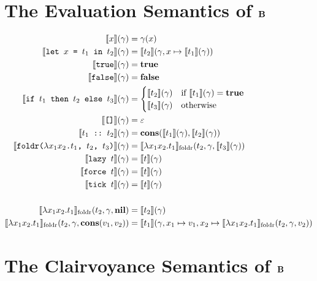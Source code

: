 \appendix
{}

\section{The Evaluation Semantics of \(\LB\)}\label{apx:eval-semantics}

\begin{align*}
  \EE{x}{\gamma} &= \gamma(x) \\
  \EE{\tlet{x}{t_1}{t_2}}{\gamma} &= \EE{t_2}{\gamma, x \mapsto \EE{t_1}{\gamma}} \\
  \EE{\ttrue}{\gamma} &= \strue \\
  \EE{\tfalse}{\gamma} &= \sfalse \\
  \EE{\tif{t_1}{t_2}{t_3}}{\gamma} &=
    \begin{cases}
      \EE{t_2}{\gamma} & \text{if \( \EE{t_{1}}{\gamma} = \strue \)} \\
      \EE{t_3}{\gamma} & \text{otherwise}
    \end{cases} \\
  \EE{\tnil}{\gamma} &= \varepsilon \\
  \EE{\tcons{t_1}{t_2}}{\gamma} &= \scons{\EE{t_1}{\gamma}}{\EE{t_2}{\gamma}} \\
  \EE{\tfoldr{x_1}{x_2}{t_1}{t_2}{t_3}}{\gamma} &= \EEF{x_1}{x_2}{t_1}{t_2}{\gamma}{\EE{t_3}{\gamma}} \\
  \EE{\tlazy{t}}{\gamma} &= \EE{t}{\gamma} \\
  \EE{\tforce{t}}{\gamma} &= \EE{t}{\gamma} \\
  \EE{\ttick{t}}{\gamma} &= \EE{t}{\gamma} \\ \\
  \EEF{x_1}{x_2}{t_1}{t_2}{\gamma}{\snil} &= \EE{t_2}{\gamma} \\
  \EEF{x_1}{x_2}{t_1}{t_2}{\gamma}{\scons{v_1}{v_2}} &= \EE{t_1}{\gamma, x_1 \mapsto v_1, x_2 \mapsto \EEF{x_1}{x_2}{t_1}{t_2}{\gamma}{v_2}}
\end{align*}

\section{The Clairvoyance Semantics of \(\LB\)}\label{apx:clairvoyance-semantics}

